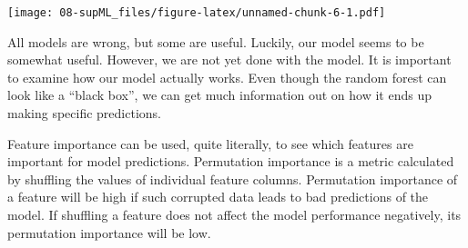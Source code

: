 \documentclass[
  oneside]{book}
\newenvironment{Shaded}{\begin{snugshade}}{\end{snugshade}}
\newcommand{\AttributeTok}[1]{\textcolor[rgb]{0.77,0.63,0.00}{#1}}
\newcommand{\CommentTok}[1]{\textcolor[rgb]{0.56,0.35,0.01}{\textit{#1}}}
\newcommand{\ConstantTok}[1]{\textcolor[rgb]{0.00,0.00,0.00}{#1}}
\newcommand{\DecValTok}[1]{\textcolor[rgb]{0.00,0.00,0.81}{#1}}
\newcommand{\FunctionTok}[1]{\textcolor[rgb]{0.00,0.00,0.00}{#1}}
\newcommand{\NormalTok}[1]{#1}
\newcommand{\OtherTok}[1]{\textcolor[rgb]{0.56,0.35,0.01}{#1}}
\newcommand{\SpecialCharTok}[1]{\textcolor[rgb]{0.00,0.00,0.00}{#1}}
\newcommand{\StringTok}[1]{\textcolor[rgb]{0.31,0.60,0.02}{#1}}
\begin{document}
\begin{Shaded}
\end{Shaded}

\texttt{[image: 08-supML\_files/figure-latex/unnamed-chunk-6-1.pdf]}

All models are wrong, but some are useful. Luckily, our model seems to be somewhat useful.
However, we are not yet done with the model. It is important to examine how our model
actually works. Even though the random forest can look like a ``black box'', we can get
much information out on how it ends up making specific predictions.

Feature importance can be used, quite literally, to see which features are important
for model predictions. Permutation importance is a metric calculated by shuffling the
values of individual feature columns. Permutation importance of a feature will be high
if such corrupted data leads to bad predictions of the model. If shuffling a feature
does not affect the model performance negatively, its permutation importance will be low.
\end{document}
